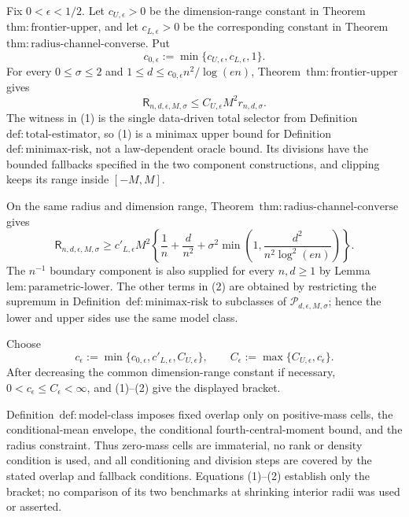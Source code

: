 Fix \(0<\epsilon<1/2\).  Let \(c_{U,\epsilon}>0\) be the dimension-range constant in Theorem~\(\mathrm{thm:frontier\text{-}upper}\), and let \(c_{L,\epsilon}>0\) be the corresponding constant in Theorem~\(\mathrm{thm:radius\text{-}channel\text{-}converse}\).  Put
\[
 c_{0,\epsilon}:=\min\{c_{U,\epsilon},c_{L,\epsilon},1\}.
\]
For every \(0\le\sigma\le2\) and \(1\le d\le c_{0,\epsilon}n^2/\log(en)\), Theorem~\(\mathrm{thm:frontier\text{-}upper}\) gives
\[
 \mathsf R_{n,d,\epsilon,M,\sigma}
 \le C_{U,\epsilon}M^2r_{n,d,\sigma}.
\tag{1}
\]
The witness in (1) is the single data-driven total selector from Definition~\(\mathrm{def:total\text{-}estimator}\), so (1) is a minimax upper bound for Definition~\(\mathrm{def:minimax\text{-}risk}\), not a law-dependent oracle bound.  Its divisions have the bounded fallbacks specified in the two component constructions, and clipping keeps its range inside \([-M,M]\).

On the same radius and dimension range, Theorem~\(\mathrm{thm:radius\text{-}channel\text{-}converse}\) gives
\[
 \mathsf R_{n,d,\epsilon,M,\sigma}
 \ge c'_{L,\epsilon}M^2\left\{
 \frac1n+\frac d{n^2}
 +\sigma^2\min\left(1,\frac{d^2}{n^2\log^2(en)}\right)
 \right\}.
\tag{2}
\]
The \(n^{-1}\) boundary component is also supplied for every \(n,d\ge1\) by Lemma~\(\mathrm{lem:parametric\text{-}lower}\).  The other terms in (2) are obtained by restricting the supremum in Definition~\(\mathrm{def:minimax\text{-}risk}\) to subclasses of \(\mathcal P_{d,\epsilon,M,\sigma}\); hence the lower and upper sides use the same model class.

Choose
\[
 c_{\epsilon}:=\min\{c_{0,\epsilon},c'_{L,\epsilon},C_{U,\epsilon}\},
 \qquad
 C_{\epsilon}:=\max\{C_{U,\epsilon},c_{\epsilon}\}.
\]
After decreasing the common dimension-range constant if necessary, \(0<c_{\epsilon}\le C_{\epsilon}<\infty\), and (1)--(2) give the displayed bracket.

Definition~\(\mathrm{def:model\text{-}class}\) imposes fixed overlap only on positive-mass cells, the conditional-mean envelope, the conditional fourth-central-moment bound, and the radius constraint.  Thus zero-mass cells are immaterial, no rank or density condition is used, and all conditioning and division steps are covered by the stated overlap and fallback conditions.  Equations (1)--(2) establish only the bracket; no comparison of its two benchmarks at shrinking interior radii was used or asserted.